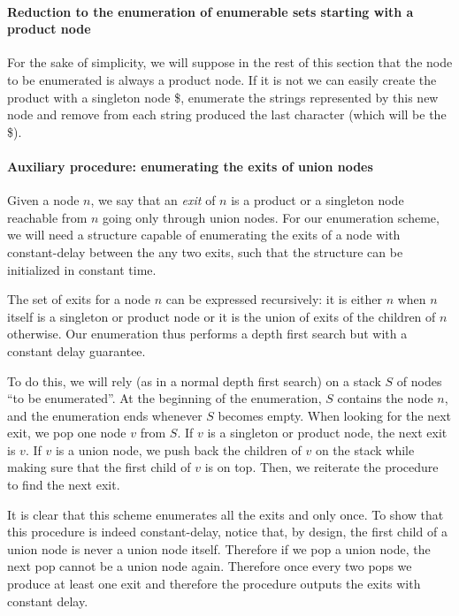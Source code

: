 \paragraph{Reduction to the enumeration of enumerable sets starting
with a product node} For the sake of simplicity, we will suppose in
the rest of this section that the node to be enumerated is always a
product node. If it is not we can easily create the product with a
singleton node \$, enumerate the strings represented by this new node
and remove from each string produced the last character (which will be
the \$).

\paragraph{Auxiliary procedure: enumerating the exits of union nodes}
Given a node $n$, we say that an \emph{exit} of $n$ is a product or a
singleton node reachable from $n$ going only through union nodes.  For
our enumeration scheme, we will need a structure capable of
enumerating the exits of a node with constant-delay between the
any two exits, such that the structure can be initialized in constant time.

The set of exits for a node $n$ can be expressed recursively: it is
either $n$ when $n$ itself is a singleton or product node or it is the
union of exits of the children of $n$ otherwise. Our enumeration thus
performs a depth first search but with a constant delay guarantee.

To do this, we will rely (as in a normal depth first search) on a
stack $S$ of nodes ``to be enumerated''. At the beginning of the
enumeration, $S$ contains the node $n$, and the enumeration ends
whenever $S$ becomes empty. When looking for the next exit, we pop one
node $v$ from $S$. If $v$ is a singleton or product node, the next
exit is $v$. If $v$ is a union node, we push back the children of $v$
on the stack while making sure that the first child of $v$ is on
top. Then, we reiterate the procedure to find the next exit.

It is clear that this scheme enumerates all the exits and only once.
To show that this procedure is indeed constant-delay, notice that, by
design, the first child of a union node is never a
union node itself.  Therefore if we pop a union node, the next pop
cannot be a union node again. Therefore once every two pops we produce
at least one exit and therefore the procedure outputs the exits
with constant delay.
 
 
